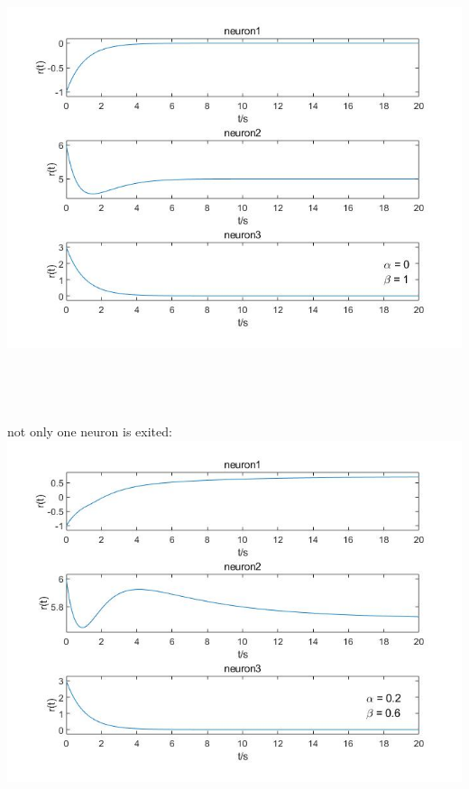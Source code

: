 \documentclass{article}
\begin{document}
\begin{enumerate}
          \includegraphics[scale = 0.55]{pics/3_1.jpg}
          \\
          \\
          \\
          \\
          \\
          not only one neuron is exited:\\
          \includegraphics[scale = 0.45]{pics/3_2.jpg}
\end{enumerate}
\end{document}
